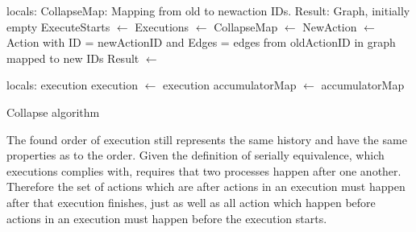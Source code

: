 	\begin{algorithm}
		\begin{algorithmic}
			\State
				locals: CollapseMap: Mapping from old to newaction IDs.
				\State\hspace{28pt} Result: Graph, initially empty
				\State
				\State ExecuteStarts $\leftarrow$  \State
				Executions $\leftarrow$ 
				\State
					CollapseMap $\leftarrow$ 
				\EndFor
					\State
					NewAction $\leftarrow$ Action with \State\hspace{28pt}ID = newActionID and \State\hspace{28pt}Edges = edges from oldActionID in graph mapped to new IDs\State
					Result $\leftarrow$  \State{}
				\EndFor
				
			\EndFunction
			\State
				\State locals: execution
				 \State
					execution $\leftarrow$ 
				\EndWhile\State
				\Return execution
			\EndFunction
			\State
				\State
					accumulatorMap $\leftarrow$ 
				\EndFor \State
				\Return accumulatorMap
			\EndFunction
		\end{algorithmic}
		\caption{Collapse algorithm}
		\label{alg:collapse}
	\end{algorithm}
	
	The found order of execution still represents the same history and have the same properties as to the order. Given the definition of serially equivalence, which executions complies with, requires that two processes happen after one another. Therefore the set of actions which are after actions in an execution must happen after that execution finishes, just as well as all action which happen before actions in an execution must happen before the execution starts. 

